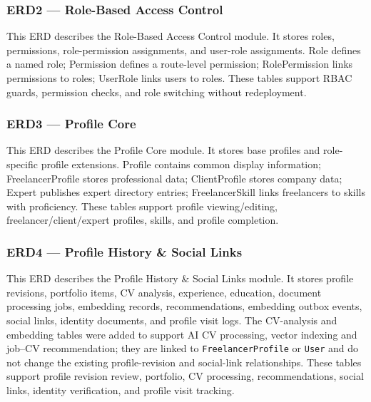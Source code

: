
\subsubsection{ERD2 --- Role-Based Access Control}

This ERD describes the Role-Based Access Control module. It stores roles, permissions, role-permission assignments, and user-role assignments. Role defines a named role; Permission defines a route-level permission; RolePermission links permissions to roles; UserRole links users to roles. These tables support RBAC guards, permission checks, and role switching without redeployment.


\subsubsection{ERD3 --- Profile Core}

This ERD describes the Profile Core module. It stores base profiles and role-specific profile extensions. Profile contains common display information; FreelancerProfile stores professional data; ClientProfile stores company data; Expert publishes expert directory entries; FreelancerSkill links freelancers to skills with proficiency. These tables support profile viewing/editing, freelancer/client/expert profiles, skills, and profile completion.


\subsubsection{ERD4 --- Profile History \& Social Links}

This ERD describes the Profile History \& Social Links module. It stores profile revisions, portfolio items, CV analysis, experience, education, document processing jobs, embedding records, recommendations, embedding outbox events, social links, identity documents, and profile visit logs. The CV-analysis and embedding tables were added to support AI CV processing, vector indexing and job--CV recommendation; they are linked to \texttt{FreelancerProfile} or \texttt{User} and do not change the existing profile-revision and social-link relationships. These tables support profile revision review, portfolio, CV processing, recommendations, social links, identity verification, and profile visit tracking.


